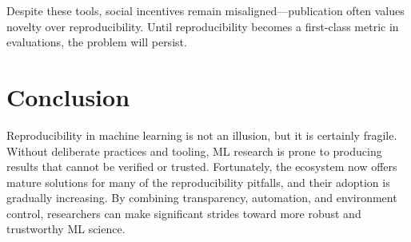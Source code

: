 \documentclass[11pt]{article}
\begin{document}
Despite these tools, social incentives remain misaligned---publication often values novelty over reproducibility. Until reproducibility becomes a first-class metric in evaluations, the problem will persist.


\section{Conclusion}
\label{sec:conclusion}
Reproducibility in machine learning is not an illusion, but it is certainly fragile. Without deliberate practices and tooling, ML research is prone to producing results that cannot be verified or trusted. Fortunately, the ecosystem now offers mature solutions for many of the reproducibility pitfalls, and their adoption is gradually increasing. By combining transparency, automation, and environment control, researchers can make significant strides toward more robust and trustworthy ML science.
\end{document}
